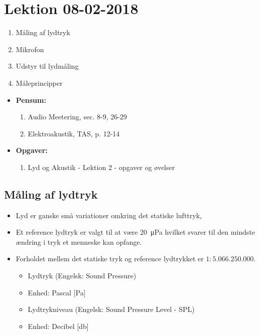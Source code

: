 \section{Lektion 08-02-2018}

\begin{enumerate}
	\item Måling af lydtryk
	\item Mikrofon
	\item Udstyr til lydmåling
	\item Måleprincipper
\end{enumerate}

\begin{mdframed}[style=exampledefault]
	\begin{itemize}
		\item \textbf{Pensum:} 
		\begin{enumerate}
			\item Audio Meetering, sec. 8-9, 26-29
			\item Elektroakustik, TAS,  p. 12-14
		\end{enumerate}
		\item \textbf{Opgaver:} 
		\begin{enumerate}
			\item Lyd og Akustik - Lektion 2 - opgaver og øvelser
		\end{enumerate}
	\end{itemize}
\end{mdframed}

\subsection{Måling af lydtryk}
\begin{itemize}
	\item Lyd er ganske små variationer	omkring det statiske lufttryk,
	\item Et reference lydtryk er valgt til at være \SI{20}{\micro\pascal} hvilket svarer til den mindste ændring i tryk et menneske kan opfange.
	\item Forholdet mellem det statiske tryk og reference lydtrykket er $1 :
	5.066.250.000$.
	\begin{itemize}
		\item Lydtryk (Engelsk: Sound Pressure)
		\item Enhed: Pascal [\si{\pascal}]
		\item Lydtrykniveau (Engelsk: Sound Pressure Level - SPL)
		\item Enhed: Decibel [\si{\decibel}]
	\end{itemize}
\end{itemize}

